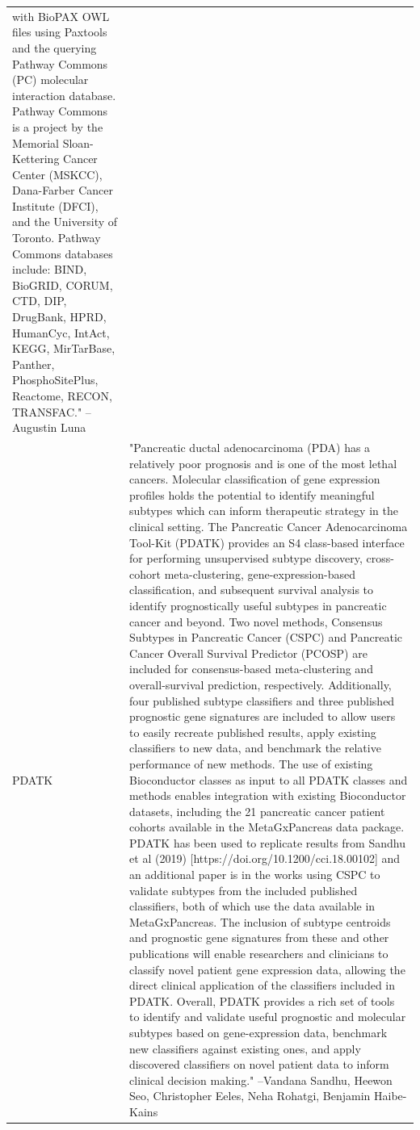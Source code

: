 \documentclass[]{article}
\begin{document}
\begin{longtable}[t]{l>{\raggedright\arraybackslash}p{25em}}
with BioPAX OWL files using Paxtools and the querying Pathway
Commons (PC) molecular interaction database. Pathway Commons is
a project by the Memorial Sloan-Kettering Cancer Center
(MSKCC), Dana-Farber Cancer Institute (DFCI), and the
University of Toronto. Pathway Commons databases include: BIND,
BioGRID, CORUM, CTD, DIP, DrugBank, HPRD, HumanCyc, IntAct,
KEGG, MirTarBase, Panther, PhosphoSitePlus, Reactome, RECON,
TRANSFAC." --Augustin Luna\\
PDATK & "Pancreatic ductal adenocarcinoma (PDA) has a relatively
poor prognosis and is one of the most lethal cancers. Molecular
classification of gene expression profiles holds the potential
to identify meaningful subtypes which can inform therapeutic
strategy in the clinical setting. The Pancreatic Cancer
Adenocarcinoma Tool-Kit (PDATK) provides an S4 class-based
interface for performing unsupervised subtype discovery,
cross-cohort meta-clustering, gene-expression-based
classification, and subsequent survival analysis to identify
prognostically useful subtypes in pancreatic cancer and beyond.
Two novel methods, Consensus Subtypes in Pancreatic Cancer
(CSPC) and Pancreatic Cancer Overall Survival Predictor (PCOSP)
are included for consensus-based meta-clustering and
overall-survival prediction, respectively. Additionally, four
published subtype classifiers and three published prognostic
gene signatures are included to allow users to easily recreate
published results, apply existing classifiers to new data, and
benchmark the relative performance of new methods. The use of
existing Bioconductor classes as input to all PDATK classes and
methods enables integration with existing Bioconductor
datasets, including the 21 pancreatic cancer patient cohorts
available in the MetaGxPancreas data package. PDATK has been
used to replicate results from Sandhu et al (2019)
[https://doi.org/10.1200/cci.18.00102] and an additional paper
is in the works using CSPC to validate subtypes from the
included published classifiers, both of which use the data
available in MetaGxPancreas. The inclusion of subtype centroids
and prognostic gene signatures from these and other
publications will enable researchers and clinicians to classify
novel patient gene expression data, allowing the direct
clinical application of the classifiers included in PDATK.
Overall, PDATK provides a rich set of tools to identify and
validate useful prognostic and molecular subtypes based on
gene-expression data, benchmark new classifiers against
existing ones, and apply discovered classifiers on novel
patient data to inform clinical decision making." --Vandana Sandhu, Heewon Seo, Christopher Eeles, Neha Rohatgi, Benjamin Haibe-Kains\\

\end{longtable}
\end{document}
